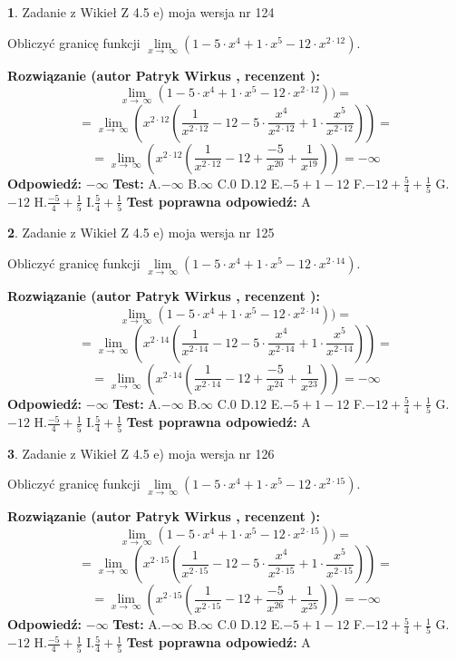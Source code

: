 \documentclass[12pt, a4paper]{article}
\theoremstyle{definition} %
\newtheorem{zad}{}
\newcommand{\zadStart}[1]{\begin{zad}#1\newline}
\newcommand{\zadStop}{\end{zad}}
\newcommand{\rozwStart}[2]{\noindent \textbf{Rozwiązanie (autor #1 , recenzent #2): }\newline}
\newcommand{\rozwStop}{\newline}
\newcommand{\odpStart}{\noindent \textbf{Odpowiedź:}\newline}
\newcommand{\odpStop}{\newline}
\newcommand{\testStart}{\noindent \textbf{Test:}\newline}
\newcommand{\testStop}{\newline}
\newcommand{\kluczStart}{\noindent \textbf{Test poprawna odpowiedź:}\newline}
\newcommand{\kluczStop}{\newline}
\begin{document}
\zadStart{Zadanie z Wikieł Z 4.5 e) moja wersja nr 124}



Obliczyć granicę funkcji  $\lim\limits_{x\to\ \infty}(1 - 5 \cdot x^{4}+1 \cdot x^{5}- 12 \cdot x^{2\cdot12})$.
\zadStop
\rozwStart{Patryk Wirkus}{}
$$\lim\limits_{x\to\ \infty}(1 - 5 \cdot x^{4}+1 \cdot x^{5}- 12 \cdot x^{2\cdot12}))=$$
$$=\lim\limits_{x\to\ \infty}(x^{2\cdot12}(\frac{1}{x^{2\cdot12}}-12 -5 \cdot \frac{x^{4}}{x^{2\cdot12}}+1 \cdot \frac{x^{5}}{x^{2\cdot12}}))=$$
$$=\lim\limits_{x\to\ \infty}(x^{2\cdot12}(\frac{1}{x^{2\cdot12}}-12 + \frac{-5}{x^{20}}+ \frac{1}{x^{19}}))=-\infty$$
\rozwStop
\odpStart
$-\infty$
\odpStop
\testStart
A.$-\infty$ B.$\infty$ C.$0$ D.$12$ E.$-5 + 1 - 12$
F.$-12+\frac{5}{4}+\frac{1}{5}$ G.$-12$
H.$\frac{-5}{4}+\frac{1}{5}$
I.$\frac{5}{4}+\frac{1}{5}$
\testStop
\kluczStart
A
\kluczStop



\zadStart{Zadanie z Wikieł Z 4.5 e) moja wersja nr 125}



Obliczyć granicę funkcji  $\lim\limits_{x\to\ \infty}(1 - 5 \cdot x^{4}+1 \cdot x^{5}- 12 \cdot x^{2\cdot14})$.
\zadStop
\rozwStart{Patryk Wirkus}{}
$$\lim\limits_{x\to\ \infty}(1 - 5 \cdot x^{4}+1 \cdot x^{5}- 12 \cdot x^{2\cdot14}))=$$
$$=\lim\limits_{x\to\ \infty}(x^{2\cdot14}(\frac{1}{x^{2\cdot14}}-12 -5 \cdot \frac{x^{4}}{x^{2\cdot14}}+1 \cdot \frac{x^{5}}{x^{2\cdot14}}))=$$
$$=\lim\limits_{x\to\ \infty}(x^{2\cdot14}(\frac{1}{x^{2\cdot14}}-12 + \frac{-5}{x^{24}}+ \frac{1}{x^{23}}))=-\infty$$
\rozwStop
\odpStart
$-\infty$
\odpStop
\testStart
A.$-\infty$ B.$\infty$ C.$0$ D.$12$ E.$-5 + 1 - 12$
F.$-12+\frac{5}{4}+\frac{1}{5}$ G.$-12$
H.$\frac{-5}{4}+\frac{1}{5}$
I.$\frac{5}{4}+\frac{1}{5}$
\testStop
\kluczStart
A
\kluczStop



\zadStart{Zadanie z Wikieł Z 4.5 e) moja wersja nr 126}



Obliczyć granicę funkcji  $\lim\limits_{x\to\ \infty}(1 - 5 \cdot x^{4}+1 \cdot x^{5}- 12 \cdot x^{2\cdot15})$.
\zadStop
\rozwStart{Patryk Wirkus}{}
$$\lim\limits_{x\to\ \infty}(1 - 5 \cdot x^{4}+1 \cdot x^{5}- 12 \cdot x^{2\cdot15}))=$$
$$=\lim\limits_{x\to\ \infty}(x^{2\cdot15}(\frac{1}{x^{2\cdot15}}-12 -5 \cdot \frac{x^{4}}{x^{2\cdot15}}+1 \cdot \frac{x^{5}}{x^{2\cdot15}}))=$$
$$=\lim\limits_{x\to\ \infty}(x^{2\cdot15}(\frac{1}{x^{2\cdot15}}-12 + \frac{-5}{x^{26}}+ \frac{1}{x^{25}}))=-\infty$$
\rozwStop
\odpStart
$-\infty$
\odpStop
\testStart
A.$-\infty$ B.$\infty$ C.$0$ D.$12$ E.$-5 + 1 - 12$
F.$-12+\frac{5}{4}+\frac{1}{5}$ G.$-12$
H.$\frac{-5}{4}+\frac{1}{5}$
I.$\frac{5}{4}+\frac{1}{5}$
\testStop
\kluczStart
A
\kluczStop
\end{document}
